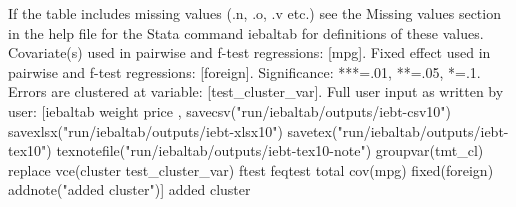 If the table includes missing values (.n, .o, .v etc.) see the Missing values section in the help file for the Stata command iebaltab for definitions of these values. Covariate(s) used in pairwise and f-test regressions: [mpg]. Fixed effect used in pairwise and f-test regressions: [foreign]. Significance: ***=.01, **=.05, *=.1. Errors are clustered at variable: [test\_cluster\_var]. Full user input as written by user: [iebaltab weight price , savecsv("run/iebaltab/outputs/iebt-csv10") savexlsx("run/iebaltab/outputs/iebt-xlsx10") savetex("run/iebaltab/outputs/iebt-tex10") texnotefile("run/iebaltab/outputs/iebt-tex10-note") groupvar(tmt\_cl) replace vce(cluster test\_cluster\_var) ftest feqtest total cov(mpg) fixed(foreign) addnote("added cluster")] added cluster
